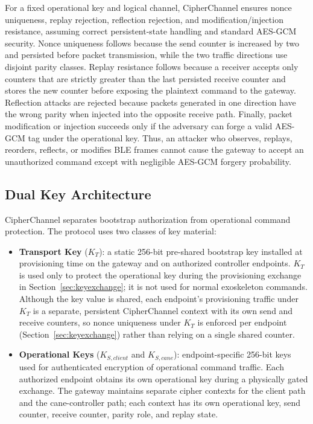 \documentclass[journal]{IEEEtran}
\begin{document}
For a fixed operational key and logical channel, CipherChannel ensures nonce uniqueness, replay rejection, reflection rejection, and modification/injection resistance, assuming correct persistent-state handling and standard AES-GCM security. Nonce uniqueness follows because the send counter is increased by two and persisted before packet transmission, while the two traffic directions use disjoint parity classes. Replay resistance follows because a receiver accepts only counters that are strictly greater than the last persisted receive counter and stores the new counter before exposing the plaintext command to the gateway. Reflection attacks are rejected because packets generated in one direction have the wrong parity when injected into the opposite receive path. Finally, packet modification or injection succeeds only if the adversary can forge a valid AES-GCM tag under the operational key. Thus, an attacker who observes, replays, reorders, reflects, or modifies BLE frames cannot cause the gateway to accept an unauthorized command except with negligible AES-GCM forgery probability.

\subsection{Dual Key Architecture}
\label{sec:dualkey}

CipherChannel separates bootstrap authorization from operational command
protection. The protocol uses two classes of key material:

\begin{itemize}
  \item \textbf{Transport Key} ($K_T$): a static 256-bit pre-shared bootstrap key installed at provisioning time on the gateway and on authorized controller endpoints. $K_T$ is used only to protect the operational key during the provisioning exchange in Section~\ref{sec:keyexchange}; it is not used for normal exoskeleton commands. Although the key value is shared, each endpoint's provisioning traffic under $K_T$ is a separate, persistent CipherChannel context with its own send and receive counters, so nonce uniqueness under $K_T$ is enforced per endpoint (Section~\ref{sec:keyexchange}) rather than relying on a single shared counter.
  \item \textbf{Operational Keys} ($K_{S,client}$ and $K_{S,cane}$): endpoint-specific 256-bit keys used for authenticated encryption of operational command traffic. Each authorized endpoint obtains its own operational key during a physically gated exchange. The gateway maintains separate cipher contexts for the client path and the cane-controller path; each context has its own operational key, send counter, receive counter, parity role, and replay state.
\end{itemize}
\end{document}
